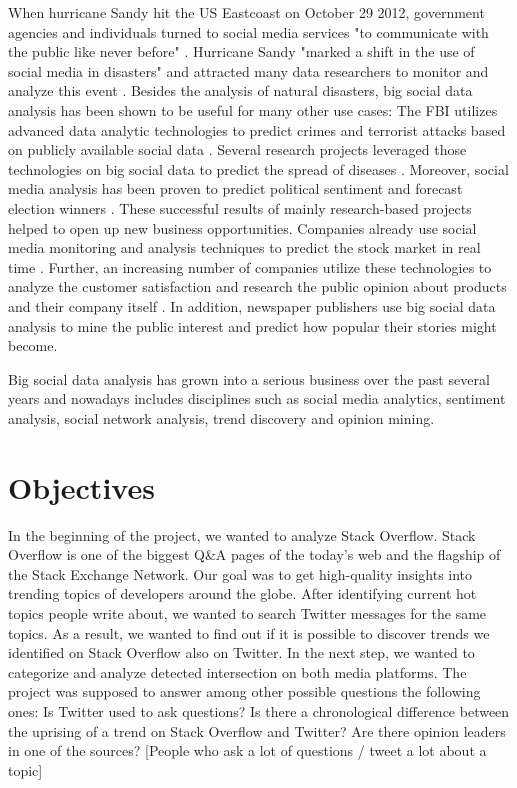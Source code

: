 When hurricane Sandy hit the US Eastcoast on October 29 2012, government agencies and individuals turned to social media services "to communicate with the public like never before" \cite{emergencymgmt2013sandy}. Hurricane Sandy "marked a shift in the use of social media in disasters" \cite[6]{security13sandy} and attracted many data researchers to monitor and analyze this event \cite{kumar2011tweettracker,carageamapping2014sandy}. Besides the analysis of natural disasters, big social data analysis has been shown to be useful for many other use cases: The FBI utilizes advanced data analytic technologies to predict crimes and terrorist attacks based on publicly available social data \cite{wang2012automatic}. Several research projects leveraged those technologies on big social data to predict the spread of diseases \cite{Google09detection,gft2014}. Moreover, social media analysis has been proven to predict political sentiment and forecast election winners \cite{bermingham2011using}. These successful results of mainly research-based projects helped to open up new business opportunities. Companies already use social media monitoring and analysis techniques to predict the stock market in real time \cite{bollen2011twitter,alcorn2013stockmarket}. Further, an increasing number of companies utilize these technologies to analyze the customer satisfaction and research the public opinion about products and their company itself \cite{journals/expert/CambriaSXH13}. In addition, newspaper publishers use big social data analysis to mine the public interest and predict how popular their stories might become.

Big social data analysis has grown into a serious business over the past several years and nowadays includes disciplines such as social media analytics, sentiment analysis, social network analysis, trend discovery and opinion mining.


\section{Objectives}
\label{sec:objectives}
In the beginning of the project, we wanted to analyze Stack Overflow. Stack Overflow is one of the biggest Q\&A pages of the today’s web and the flagship of the Stack Exchange Network.
Our goal was to get high-quality insights into trending topics of developers around the globe. 
After identifying current hot topics people write about, we wanted to search Twitter messages for the same topics. As a result, we wanted to find out if it is possible to discover trends we identified on Stack Overflow also on Twitter. In the next step, we wanted to categorize and analyze detected intersection on both media platforms. The project was supposed to answer among other possible questions the following ones: 
Is Twitter used to ask questions?
Is there a chronological difference between the uprising of a trend on Stack Overflow and Twitter?
Are there opinion leaders in one of the sources? [People who ask a lot of questions / tweet a lot about a topic]

